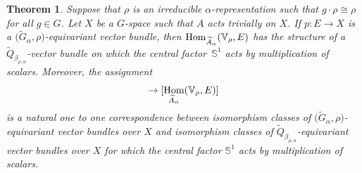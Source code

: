 \documentclass[10pt,a4paper]{amsart}
\def\S{\mathbb{S}}
\def\V{\mathbb{V}}
\DeclareMathOperator{\Hom}{\textup{Hom}}
\newtheorem{Th}{Theorem}[section]
\theoremstyle{definition}
\numberwithin{equation}{section}
\begin{document}
\begin{Th}\label{teo,bij}
Suppose that $\rho$ is an irreducible $\alpha$-representation such that $g\cdot\rho\cong\rho$
for all $g \in G$. Let $X$ be a $G$-space such that $A$ acts trivially on $X$.
If $p\colon E\rightarrow X$ is a $\big(\widetilde{G}_{\alpha}, \rho\big)$-equivariant vector bundle, then
$\Hom_{\widetilde{A}_{\alpha}}(\V_{\rho},E)$ has the
structure of a $\widetilde{Q}_{\beta_{\rho,\alpha}}$-vector bundle on which
the central factor~$\S^{1}$ acts by multiplication of
scalars. Moreover, the assignment
\begin{gather*}
[E]\rightarrow
[\Hom_{\widetilde{A}_{\alpha}}(\V_{\rho},E)]
\end{gather*}
is a natural one to one correspondence between isomorphism
classes of $\big(\widetilde{G}_{\alpha},\rho\big)$-equivariant
vector bundles over $X$ and isomorphism classes of
$\widetilde{Q}_{\beta_{\rho,\alpha}}$-equivariant vector bundles over $X$
for which the central factor $\S^{1}$ acts by multiplication of scalars.
\end{Th}
\end{document}
